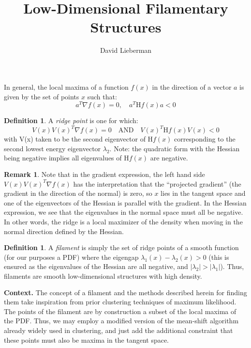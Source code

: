 \documentclass[letterpaper,reqno, 11pt]{amsart}
\theoremstyle{plain}
\theoremstyle{definition}
\newtheorem{remark}{Remark}
\newtheorem{definition}[section]{Definition}
\newcommand{\1}{\mathds{1}}
\begin{document}
\title{Low-Dimensional Filamentary Structures}
\author{David Lieberman}
\maketitle
\thispagestyle{fancy}

In general, the local maxima of a function $f(x)$ in the direction of a vector $a$ is given by the set of points $x$ such that:
$$a^T \nabla f(x) = 0, \quad a^T \mathrm{H}f(x)a < 0$$

\begin{definition}
A \textit{ridge point} is one for which:
$$V(x) V(x)^T \nabla f(x) = 0 \quad \text{AND} \quad V(x)^T \mathrm{H}f(x) V(x) < 0$$
with V(x) taken to be the second eigenvector of H$f(x)$ corresponding to the second lowest energy eigenvector $\lambda_2$. Note: the quadratic form with the Hessian being negative implies all eigenvalues of H$f(x)$ are negative.
\end{definition}

\begin{remark}
Note that in the gradient expression, the left hand side $V(x) V(x)^T \nabla f(x)$ has the interpretation that the “projected gradient” (the gradient in the direction of the normal) is zero, so $x$ lies in the tangent space and one of the eigenvectors of the Hessian is parallel with the gradient. In the Hessian expression, we see that the eigenvalues in the normal space must all be negative. In other words, the ridge is a local maximizer of the density when moving in the normal direction defined by the Hessian.
\end{remark}

\begin{definition}
A \textit{filament} is simply the set of ridge points of a smooth function (for our purposes a PDF) where the eigengap $\lambda_1(x) - \lambda_2(x) > 0$ (this is ensured as the eigenvalues of the Hessian are all negative, and $\lvert \lambda_2 \rvert  > \lvert \lambda_1 \rvert$). Thus, filaments are smooth low-dimensional structures with high density.
\end{definition}

\textbf{Context.} The concept of a filament and the methods described herein for finding them take inspiration from prior clustering techniques of maximum likelihood. The points of the filament are by construction a subset of the local maxima of the PDF. Thus, we may employ a modified version of the mean-shift algorithm already widely used in clustering, and just add the additional constraint that these points must also be maxima in the tangent space.
\end{document}
